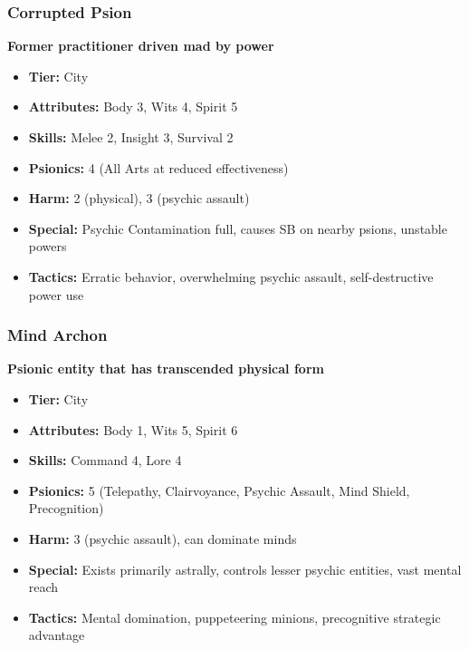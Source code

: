 \documentclass[11pt,twoside]{article}
\begin{document}
\subsubsection{Corrupted Psion}
\textbf{Former practitioner driven mad by power}
\begin{itemize}[leftmargin=*]
    \item \textbf{Tier:} City
    \item \textbf{Attributes:} Body 3, Wits 4, Spirit 5
    \item \textbf{Skills:} Melee 2, Insight 3, Survival 2
    \item \textbf{Psionics:} 4 (All Arts at reduced effectiveness)
    \item \textbf{Harm:} 2 (physical), 3 (psychic assault)
    \item \textbf{Special:} Psychic Contamination full, causes SB on nearby psions, unstable powers
    \item \textbf{Tactics:} Erratic behavior, overwhelming psychic assault, self-destructive power use
\end{itemize}

\subsubsection{Mind Archon}
\textbf{Psionic entity that has transcended physical form}
\begin{itemize}[leftmargin=*]
    \item \textbf{Tier:} City
    \item \textbf{Attributes:} Body 1, Wits 5, Spirit 6
    \item \textbf{Skills:} Command 4, Lore 4
    \item \textbf{Psionics:} 5 (Telepathy, Clairvoyance, Psychic Assault, Mind Shield, Precognition)
    \item \textbf{Harm:} 3 (psychic assault), can dominate minds
    \item \textbf{Special:} Exists primarily astrally, controls lesser psychic entities, vast mental reach
    \item \textbf{Tactics:} Mental domination, puppeteering minions, precognitive strategic advantage
\end{itemize}
\end{document}
